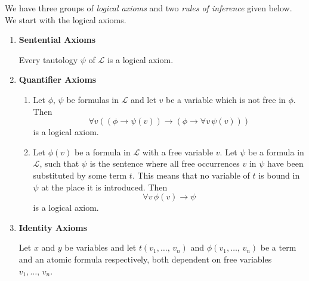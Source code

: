 \documentclass[../../main.tex]{subfiles}
\begin{document}
\begin{definition}\cite[1.3.5-1.3.9.]{Cha90}
    We have three groups of \textit{logical axioms} and two \textit{rules of inference} given below.
    We start with the logical axioms.
    \begin{enumerate}
        \item \textbf{Sentential Axioms}
        
        Every tautology $\psi$ of $\mathcal{L}$ is a logical axiom. %
        \item\label{quantifier-axioms} \textbf{Quantifier Axioms}
        \begin{enumerate}
            \item Let $\phi,\, \psi$ be formulas in $\mathcal{L}$ and let $v$ be a variable which is not free in $\phi$.
            Then
            $$\forall v \left((\phi \rightarrow \psi(v)) \rightarrow (\phi \rightarrow \forall v\, \psi(v))\right)$$
            is a logical axiom.
            \item Let $\phi(v)$ be a formula in $\mathcal{L}$ with a free variable $v$.
            Let $\psi$ be a formula in $\mathcal{L}$, 
            such that $\psi$ is the sentence where all free occurrences $v$ in $\psi$ have been substituted by some term $t$.
            This means that no variable of $t$ is bound in $\psi$ at the place it is introduced.
            Then 
            $$\forall v \, \phi(v) \rightarrow \psi$$
            is a logical axiom.
        \end{enumerate}
        \item\label{identity-axioms} \textbf{Identity Axioms}
        
        Let $x$ and $y$ be variables and let $t(v_1,\ldots,\, v_n)$ and $\phi(v_1,\ldots,\, v_n)$ be a term and an atomic formula respectively,
        both dependent on free variables $v_1,\ldots,\, v_n$.


\end{enumerate}
\end{definition}
\end{document}
